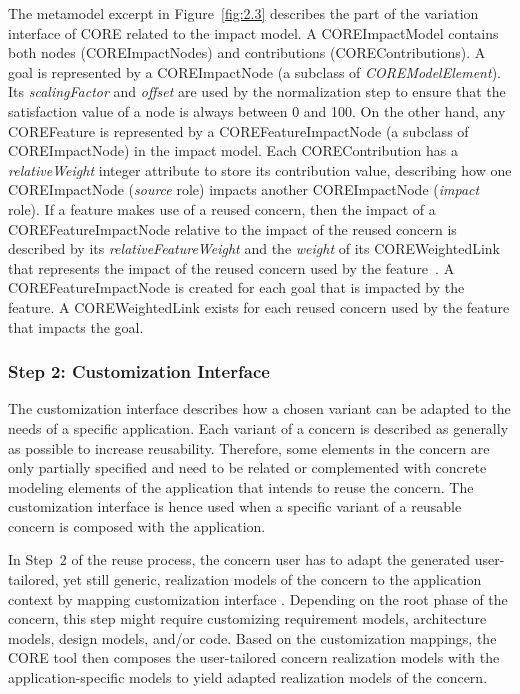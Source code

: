 The metamodel excerpt in Figure~\ref{fig:2.3} describes the part of the variation interface of CORE related to the impact model. A {\cls COREImpactModel} contains both nodes ({\cls COREImpactNode}s) and contributions ({\cls COREContribution}s). A goal is represented by a {\cls COREImpactNode} (a subclass of \textit{\cls COREModelElement}). Its \emph{scalingFactor} and \emph{offset} are used by the normalization step to ensure that the satisfaction value of a node is always between 0 and 100. On the other hand, any {\cls COREFeature} is represented by a {\cls COREFeatureImpactNode} (a subclass of {\cls COREImpactNode}) in the impact model. Each {\cls COREContribution} has a \emph{relativeWeight} integer attribute to store its contribution value, describing how one {\cls COREImpactNode} (\emph{source} role) impacts another {\cls COREImpactNode} (\emph{impact} role). If a feature makes use of a reused concern, then the impact of a {\cls COREFeatureImpactNode} relative to the impact of the reused concern is described by its \emph{relativeFeatureWeight} and the \emph{weight} of its {\cls COREWeightedLink} that represents the impact of the reused concern used by the feature~\cite{duran2015evaluation, alexandre2015support}. A {\cls COREFeatureImpactNode} is created for each goal that is impacted by the feature. A {\cls COREWeightedLink} exists for each reused concern used by the feature that impacts the goal.

\subsubsection{Step 2: Customization Interface}

The customization interface describes how a chosen variant can be adapted to the needs of a specific application. Each variant of a concern is described as generally as possible to increase reusability. Therefore, some elements in the concern are only partially specified and need to be related or complemented with concrete modeling elements of the application that intends to reuse the concern. The customization interface is hence used when a specific variant of a reusable concern is composed with the application.

In Step~2 of the reuse process, the concern user has to adapt the generated user-tailored, yet still generic, realization models of the concern to the application context by mapping  customization interface . Depending on the root phase of the concern, this step might require customizing requirement models, architecture models, design models, and/or code. Based on the customization mappings, the CORE tool then composes the user-tailored concern realization models with the application-specific models to yield adapted realization models of the concern.


